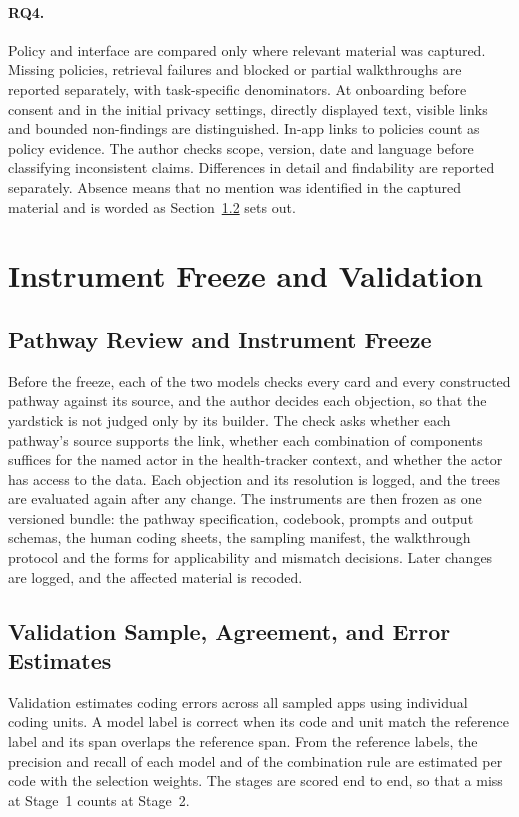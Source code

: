 \paragraph{RQ4.} Policy and interface are compared only where relevant material was captured.
Missing policies, retrieval failures and blocked or partial walkthroughs are reported
separately, with task-specific denominators. At onboarding before consent and in the initial
privacy settings, directly displayed text, visible links and bounded non-findings are
distinguished. In-app links to policies count as policy evidence. The author checks scope,
version, date and language before classifying inconsistent claims. Differences in detail and
findability are reported separately. Absence means that no mention was identified in the
captured material and is worded as Section~\ref{sec:validation} sets out.

\section{Instrument Freeze and Validation}
\label{sec:instruments}

\subsection{Pathway Review and Instrument Freeze}
\label{sec:freeze}
Before the freeze, each of the two models checks every card and every
constructed pathway against its source, and the author decides each objection, so that the yardstick is not judged only by its
builder. The check asks whether each
pathway's source supports the link, whether each combination of components suffices for the named actor in
the health-tracker context, and whether the actor has access to the data. Each objection and its
resolution is logged, and the trees are evaluated again after any change. The instruments are
then frozen as one versioned bundle: the pathway specification, codebook, prompts and output
schemas, the human coding sheets, the sampling manifest, the walkthrough protocol and the forms
for applicability and mismatch decisions. Later changes are logged, and the affected material is
recoded.

\subsection{Validation Sample, Agreement, and Error Estimates}
\label{sec:validation}
\label{sec:two-coders}
Validation estimates coding errors across all sampled apps using individual coding units. A
model label is correct when its code and unit match the reference label and its span overlaps
the reference span. From the reference labels, the precision and recall of each model and of the
combination rule are estimated per code with the selection weights. The stages are scored end
to end, so that a miss at Stage~1 counts at Stage~2.

